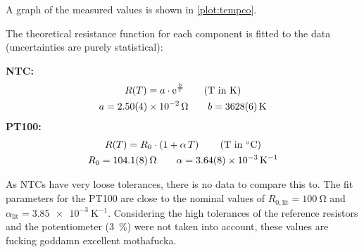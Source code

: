 A graph of the measured values is shown in \autoref{plot:tempco}.

The theoretical resistance function for each component is fitted to the data (uncertainties are purely statistical):

\textbf{NTC:}
\begin{gather*}
	R(T) = a \cdot \mathrm{e}^{\frac{b}{T}} \tag*{(T in \si{\kelvin})}\\
	a = \SI{2.50(4)e-2}{\ohm}	\qquad	b = \SI{3628(6)}{\kelvin}
\end{gather*}
\textbf{PT100:}
\begin{gather*}
	R(T) = R_0 \cdot \left(1 + \alpha \, T \right) \tag*{(T in \si{\celsius})}\\
	R_0 = \SI{104.1(8)}{\ohm}	\qquad	\alpha = \SI{3.64(8)e-3}{\kelvin^{-1}}
\end{gather*}

As NTCs have very loose tolerances, there is no data to compare this to.
The fit parameters for the PT100 are close to the nominal values of $R_{0,\text{lit}} = \SI{100}{\ohm}$ and $\alpha_\text{lit} = \SI{3.85e-3}{\kelvin^{-1}}$.
Considering the high tolerances of the reference resistors and the potentiometer (\SI{3}{\percent}) were not taken into account, these values are fucking goddamn excellent mothafucka. 

